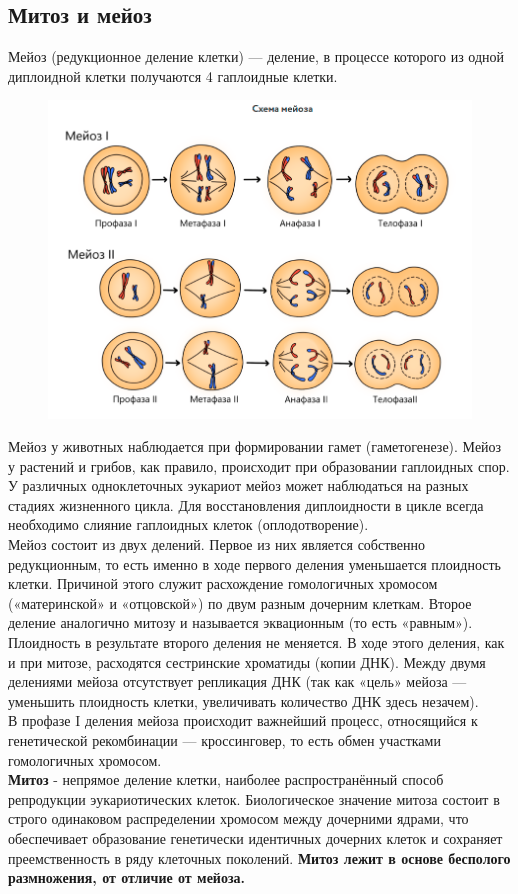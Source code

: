 \documentclass[a4paper, 12pt]{article}
\begin{document}
	\subsection{Митоз и мейоз}
	Мейоз (редукционное деление клетки) — деление, в процессе которого из одной диплоидной клетки получаются 4 гаплоидные клетки.
	\begin{figure}[H]
		\includegraphics[scale=0.5]{2mi}
	\end{figure}
Мейоз у животных наблюдается при формировании гамет (гаметогенезе). Мейоз у растений и грибов, как правило, происходит при образовании гаплоидных спор. У различных одноклеточных эукариот мейоз может наблюдаться на разных стадиях жизненного цикла. Для восстановления диплоидности в цикле всегда необходимо слияние гаплоидных клеток (оплодотворение).\\
Мейоз состоит из двух делений. Первое из них является собственно редукционным, то есть именно в ходе первого деления уменьшается плоидность клетки. Причиной этого служит расхождение гомологичных хромосом («материнской» и «отцовской») по двум разным дочерним клеткам. Второе деление аналогично митозу и называется эквационным (то есть «равным»). Плоидность в результате второго деления не меняется. В ходе этого деления, как и при митозе, расходятся сестринские хроматиды (копии ДНК). Между двумя делениями мейоза отсутствует репликация ДНК (так как «цель» мейоза — уменьшить плоидность клетки, увеличивать количество ДНК здесь незачем).\\
В профазе I деления мейоза происходит важнейший процесс, относящийся к генетической рекомбинации — кроссинговер, то есть обмен участками гомологичных хромосом.\\

	\textbf{Митоз} - непрямое деление клетки, наиболее распространённый способ репродукции эукариотических клеток. Биологическое значение митоза состоит в строго одинаковом распределении хромосом между дочерними ядрами, что обеспечивает образование генетически идентичных дочерних клеток и сохраняет преемственность в ряду клеточных поколений. \textbf{Митоз лежит в основе бесполого размножения, от отличие от мейоза.}
\end{document}

